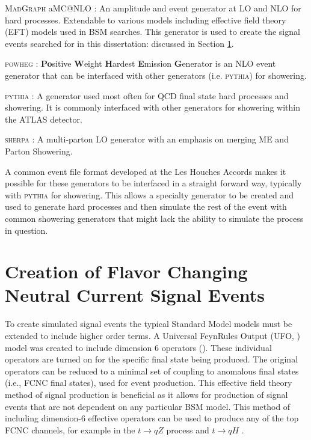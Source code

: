 \textsc{MadGraph} aMC@NLO \cite{MadGraph}: An amplitude and event generator at LO and NLO for hard processes.  Extendable to various models including effective field theory (EFT) models used in BSM searches.  This generator is used to create the signal events searched for in this dissertation: discussed in Section \ref{Sec:MG5Sig}. 

\textsc{powheg} \cite{Powheg1,Powheg2}: \textbf{Po}sitive \textbf{W}eight \textbf{H}ardest \textbf{E}mission \textbf{G}enerator is an NLO event generator that can be interfaced with other generators (i.e. \textsc{pythia}) for showering.

\textsc{pythia} \cite{Pythia8}: A generator used most often for QCD final state hard processes and showering.  It is commonly interfaced with other generators for showering within the ATLAS detector.

\textsc{sherpa} \cite{Sherpa11,Sherpa22}: A multi-parton LO generator with an emphasis on merging ME and Parton Showering.

A common event file format developed at the Les Houches Accords \cite{Alwall:2006yp} makes it possible for these generators to be interfaced in a straight forward way, typically with \textsc{pythia} for showering.  This allows a specialty generator to be created and used to generate hard processes and then simulate the rest of the event with common showering generators that might lack the ability to simulate the process in question.



\section{Creation of Flavor Changing Neutral Current Signal Events}
\label{Sec:MG5Sig}
To create simulated signal events the typical Standard Model models must be extended to include higher order terms.  A Universal FeynRules Output (UFO, \cite{UFO})   model was created to include dimension 6 operators (\cite{Dim6TermsOld, Dim6Terms}).  These individual operators are turned on for the specific final state being produced.  The original operators can be reduced to a minimal set of coupling to anomalous final states (i.e., FCNC final states)\cite{TopCouplingsAguilarSaavedra}, used for event production.  This effective field theory method of signal production is beneficial as it allows for production of signal events that are not dependent on any particular BSM model.  This method of including dimension-6 effective operators can be used to produce any of the top FCNC channels, for example in the $t\rightarrow qZ$ process \cite{FCNCtqZ} and $t\rightarrow qH$ \cite{UFOModel}.

